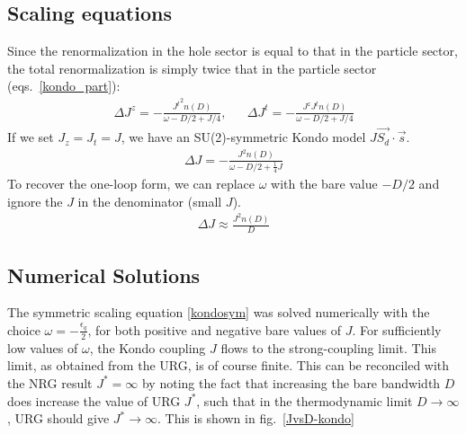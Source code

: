 \subsection{Scaling equations}
Since the renormalization in the hole sector is equal to that in the particle sector, the total renormalization is simply twice that in the particle sector (eqs.~\ref{kondo_part}):
\begin{equation}\begin{aligned}
	\Delta J^z = -\frac{{J^t}^2n(D)}{\omega - D/2 + J/4}, && \Delta J^t = -\frac{J^z J^tn(D)}{\omega - D/2 + J/4}
\end{aligned}\end{equation}
If we set \(J_z = J_t = J\), we have an SU(2)-symmetric Kondo model \(J \vec{S_d}\cdot\vec{s}\).
\begin{equation}\begin{aligned}
	\label{kondosym}
	\Delta J = - \frac{J^2 n(D)}{\omega - D/2 + \frac{1}{4}J}
\end{aligned}\end{equation}
To recover the one-loop form, we can replace \(\omega\) with the bare value \(-D/2\) and ignore the \(J\) in the denominator (small \(J\)).
\begin{equation}\begin{aligned}
	\Delta J \approx \frac{J^2 n(D)}{D}
\end{aligned}\end{equation}
\subsection{Numerical Solutions}
The symmetric scaling equation \ref{kondosym} was solved numerically with the choice \(\omega = -\frac{\epsilon_q}{2}\), for both positive and negative bare values of \(J\). For sufficiently low values of \(\omega\), the Kondo coupling \(J\) flows to the strong-coupling limit. This limit, as obtained from the URG, is of course finite. This can be reconciled with the NRG result \(J^* = \infty\) by noting the fact that increasing the bare bandwidth \(D\) does increase the value of URG \(J^*\), such that in the thermodynamic limit \(D \to \infty\), URG should give \(J^* \to \infty\). This is shown in fig.~\ref{JvsD-kondo}

